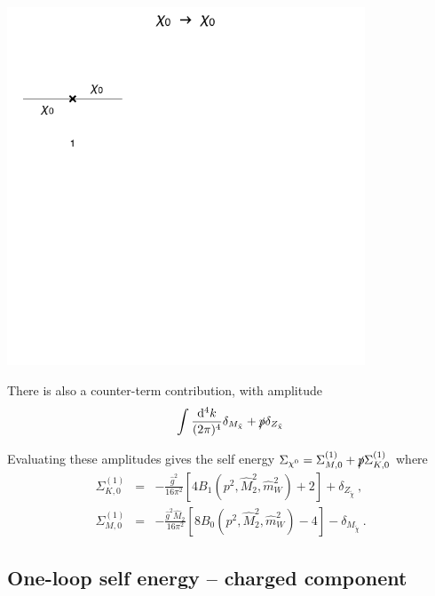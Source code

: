 \documentclass[11pt]{article}
\def\cn{\chi^0}
\renewcommand{\d}{\ensuremath{\operatorname{d}\!}}
\begin{document}
\noindent\begin{minipage}{0.3\textwidth}
\includegraphics[width=0.8\textwidth]{1loop_1c.pdf}
\end{minipage}
\noindent\begin{minipage}{0.7\textwidth}
There is also a counter-term contribution, with amplitude
\begin{align}
 \int \frac{\d^4k}{(2\pi)^4} \delta_{M_{\tilde{\chi}}} + \slashed{p}\delta_{Z_{\tilde{\chi}}}
 \end{align}
 \end{minipage}

Evaluating these amplitudes gives the self energy $\Sigma_{\cn}= \Sigma_{M, 0}^{(1)}+\slashed{p}\Sigma_{K, 0}^{(1)}$ where
\begin{eqnarray}
\Sigma_{K, 0}^{(1)} &=&
-\frac{\hat{g}^2}{16\pi^2}
\left[ 4 B_1(p^2, \hat{M}_2^2, \hat{m}_W^2) + 2 \right]
+\delta_{Z_{\tilde{\chi}}}\ , \label{eq: Neu_K} \\
\Sigma_{M, 0}^{(1)} &=&
-\frac{\hat{g}^2 \hat{M}_2}{16\pi^2}
\left[ 8 B_0(p^2, \hat{M}_2^2, \hat{m}_W^2) - 4 \right]
-\delta_{M_{\tilde{\chi}}}\ . \label{eq: Neu_M}
\end{eqnarray}


\subsection{One-loop self energy -- charged component}
\end{document}
